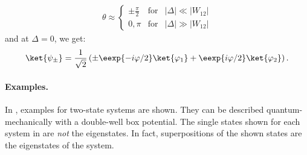 			\begin{align}
				\theta \approx \left\{ \begin{array}{lcl} \pm \frac{\pi}{2} & \text{for} & |\Delta| \ll |W_{12}|\\
				0,\pi & \text{for} & |\Delta| \gg |W_{12}| \end{array} \right. 
			\end{align}
			and at $\Delta=0$, we get:
			\begin{align}
				\ket{\psi_\pm}=\frac{1}{\sqrt{2}}\left(\pm \eexp{-i{\varphi}/{2}}\ket{\varphi_1}+ \eexp{i{\varphi}/{2}}\ket{\varphi_2}\right).
			\end{align}
				\paragraph{Examples.} In , examples for two-state systems are shown. They can be described quantum-mechanically with a double-well box potential. The single states shown for each system in  are \emph{not} the eigenstates. In fact, superpositions of the shown states are the eigenstates of the system.

